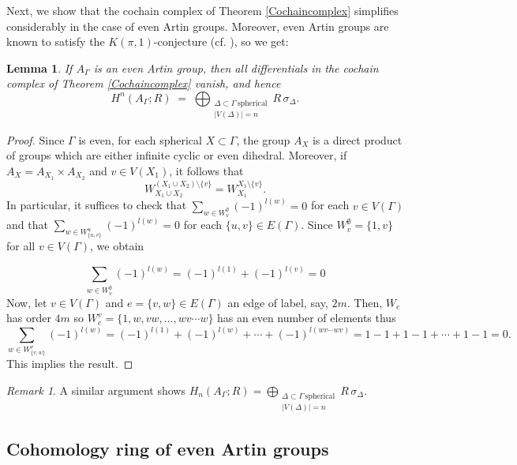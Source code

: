 \documentclass[10pt, oneside]{amsart}
\newtheorem{lemma}[theorem]{Lemma}
\theoremstyle{definition}
\theoremstyle{remark}
\newtheorem{remark}[theorem]{Remark}
\theoremstyle{plain}
\begin{document}
Next, we show that the cochain complex of Theorem \ref{Cochaincomplex} simplifies considerably in the case of even Artin groups. 
Moreover, even Artin groups are known to satisfy the $K(\pi,1)$-conjecture (cf. \cite{Charney 2004}), so we get:

\begin{lemma}\label{CohomologyEven}
	If $A_\Gamma$ is an even Artin group, then all differentials in the cochain complex of Theorem \ref{Cochaincomplex} vanish, and hence
    $$H^n(A_\Gamma;R) \;=\; \bigoplus_{\substack{\Delta\subset\Gamma \ \text{spherical}\\ |V(\Delta)|=n}} R\,\sigma_\Delta.$$
\end{lemma}

\begin{proof}
	Since $\Gamma$ is even, for each spherical $X\subset\Gamma$, the group $A_X$ is a direct product of groups which are either infinite cyclic or even dihedral. Moreover, if $A_X=A_{X_1}\times A_{X_2}$ and $v\in V(X_1)$, it follows that
	$$W^{(X_1\cup X_2)\setminus\{v\}}_{X_1\cup X_2}
	= W^{X_1\setminus\{v\}}_{X_1}.$$
		In particular, it suffices to check that $\sum\limits_{w\in W^{\emptyset}_{v}} (-1)^{l(w)}=0$ for each $v\in V(\Gamma)$ and that $\sum\limits_{w\in W^{u}_{\lbrace u,v\rbrace}} (-1)^{l(w)}=0$ for each $\lbrace u,v\rbrace\in E(\Gamma)$. Since $W^\emptyset_v=\{1,v\}$ for all $v\in V(\Gamma)$, we obtain
	
	$$\sum\limits_{w\in W^{\emptyset}_{v}} (-1)^{l(w)}=(-1)^{l(1)}+(-1)^{l(v)}=0$$
	Now, let $v\in V(\Gamma)$ and $e=\{v,w\}\in E(\Gamma)$ an edge of label, say, $2m$. Then, $W_e$ has order $4m$ so $W_e^v=\{1,w,vw,\dots,wv\cdots w\}$ has an even number of elements thus
	$$\sum\limits_{w\in W^{v}_{\lbrace v,w\rbrace}} (-1)^{l(w)}=(-1)^{l(1)}+(-1)^{l(w)}+\cdots+(-1)^{l(wv\cdots wv)}=1-1+1-1+\cdots+1-1=0.$$
	 This implies the result.
\end{proof}

\begin{remark} A similar argument shows $H_n(A_\Gamma;R)=\bigoplus_{\substack{\Delta\subset\Gamma \ \text{spherical}\\ |V(\Delta)|=n}} R\,\sigma_\Delta$.
\end{remark}




\subsection{Cohomology ring of even Artin groups}
\end{document}
